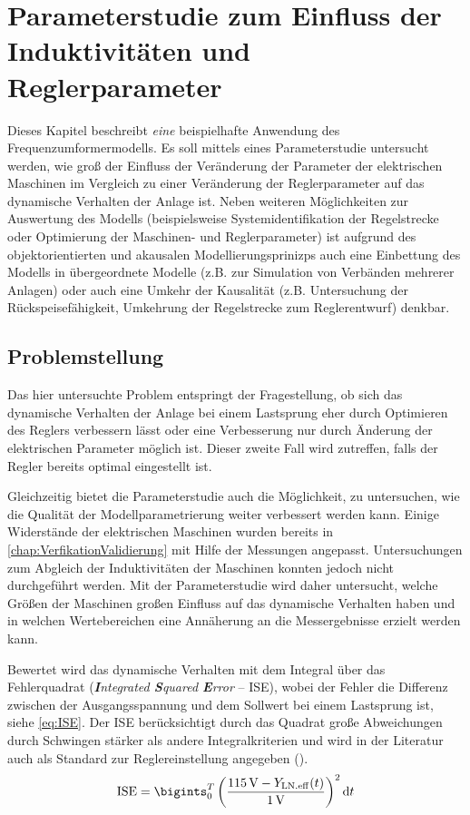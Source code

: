 \chapter{Parameterstudie zum Einfluss der Induktivitäten und Reglerparameter}
\label{chap:Auswertung}
Dieses Kapitel beschreibt \emph{eine} beispielhafte Anwendung des Frequenzumformermodells. Es soll mittels eines Parameterstudie untersucht werden, wie groß der Einfluss der Veränderung der Parameter der elektrischen Maschinen im Vergleich zu einer Veränderung der Reglerparameter auf das dynamische Verhalten der Anlage ist. Neben weiteren Möglichkeiten zur Auswertung des Modells (beispielsweise Systemidentifikation der Regelstrecke oder Optimierung der Maschinen- und Reglerparameter) ist aufgrund des objektorientierten und akausalen Modellierungsprinizps auch eine Einbettung des Modells in übergeordnete Modelle (z.B. zur Simulation von Verbänden mehrerer Anlagen) oder auch eine Umkehr der Kausalität (z.B. Untersuchung der Rückspeisefähigkeit, Umkehrung der Regelstrecke zum Reglerentwurf) denkbar.

\section{Problemstellung}
\label{sec:ProblemstellungParameterSweep}
Das hier untersuchte Problem entspringt der Fragestellung, ob sich das dynamische Verhalten der Anlage bei einem Lastsprung eher durch Optimieren des Reglers verbessern lässt oder eine Verbesserung nur durch Änderung der elektrischen Parameter möglich ist. Dieser zweite Fall wird zutreffen, falls der Regler bereits optimal eingestellt ist. 

Gleichzeitig bietet die Parameterstudie auch die Möglichkeit, zu untersuchen, wie die Qualität der Modellparametrierung weiter verbessert werden kann. Einige Widerstände der elektrischen Maschinen wurden bereits in \cref{chap:VerfikationValidierung} mit Hilfe der Messungen angepasst. Untersuchungen zum Abgleich der Induktivitäten der Maschinen konnten jedoch nicht durchgeführt werden. Mit der Parameterstudie  wird daher untersucht, welche Größen der Maschinen großen Einfluss auf das dynamische Verhalten haben und in welchen Wertebereichen eine Annäherung an die Messergebnisse erzielt werden kann.

Bewertet wird das dynamische Verhalten mit dem Integral über das Fehlerquadrat (\emph{\textbf{I}ntegrated \textbf{S}quared \textbf{E}rror} -- ISE), wobei der Fehler die Differenz zwischen der Ausgangsspannung und dem Sollwert bei einem Lastsprung ist, siehe \cref{eq:ISE}. Der ISE berücksichtigt durch das Quadrat große Abweichungen durch Schwingen stärker als andere Integralkriterien und wird in der Literatur auch als Standard zur Reglereinstellung angegeben (\cite[S.~190]{unbehauenRegelungstechnikKlassischeVerfahren2008}).
\begin{equation}
    \label{eq:ISE}
    \mathrm{ISE} = \bigints_0^T \left(\frac{\unit[115]{V}-Y_\mathrm{LN.eff}(t)}{\unit[1]{V}}\right)^2 \mathrm{d}t
\end{equation}

